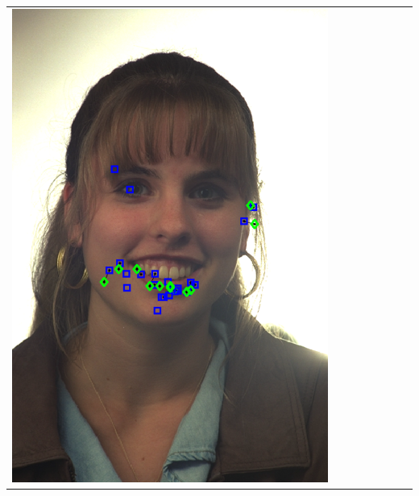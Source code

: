 \documentclass[portrait,final,a0paper,fontscale=0.277]{baposter}
\begin{document}
\begin{poster}
{{\begin{tabular}{@{}rccccccc@{}}
\parbox[c]{0.11\linewidth}{\includegraphics[width=\linewidth]{images/l_fb_fail.pdf}} &

\end{tabular}}}
\end{poster}
\end{document}
